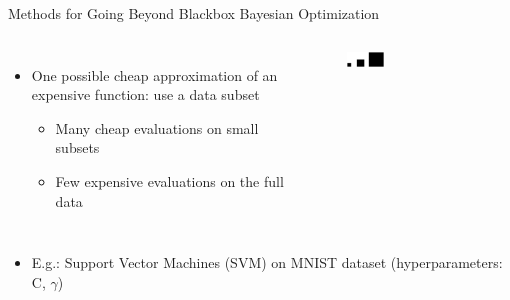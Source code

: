 \begin{frame}[c]{Methods for Going Beyond Blackbox Bayesian Optimization}

\begin{columns}

    \begin{itemize}
        \item One possible cheap approximation of an expensive function: use a data subset
        \begin{itemize}
            \item Many cheap evaluations on small subsets
            \item Few expensive evaluations on the full data
        \end{itemize}
    \end{itemize}
    
    \begin{figure}
        \centering
        \includegraphics[width=0.3\textwidth]{../w07_hpo_speedup/images/intro/black_blocks.png}
    \end{figure}

\end{columns}

\begin{itemize}
    \item E.g.: Support Vector Machines (SVM) on MNIST dataset (hyperparameters: C, $\gamma$)
\end{itemize}



\vskip -15pt


\end{frame}

